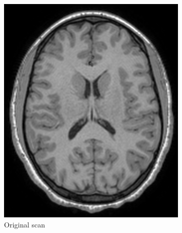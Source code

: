 \documentclass{standalone}
\begin{document}
\begin{figure}[h!]
		\centering
        \begin{subfigure}[b]{0.325\textwidth}
             \includegraphics[scale=0.215]{img/Chap3/T1W16.png}
             \caption{Original scan}
        \end{subfigure}
        \hfill
        \begin{subfigure}[b]{0.325\textwidth}

\end{subfigure}
\end{figure}
\end{document}
